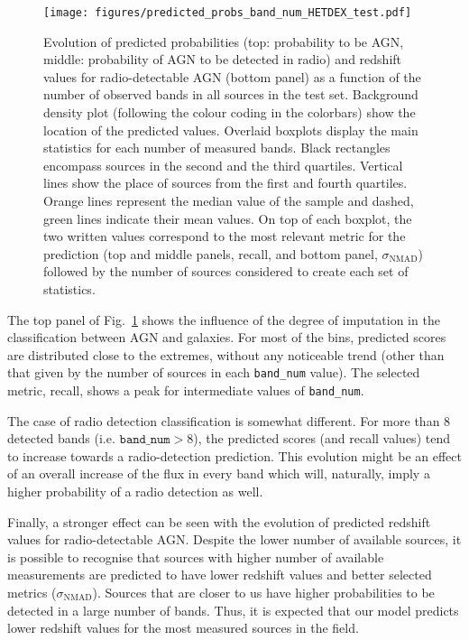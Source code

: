 \documentclass{aa}
\begin{document}
\begin{figure}
  \centering
    \texttt{[image: figures/predicted\_probs\_band\_num\_HETDEX\_test.pdf]}
  \caption{Evolution of predicted probabilities (top: probability to be AGN, middle: probability of AGN to be detected in radio) and redshift values for radio-detectable AGN (bottom panel) as a function of the number of observed bands in all sources in the test set. Background density plot (following the colour coding in the colorbars) show the location of the predicted values. Overlaid boxplots display the main statistics for each number of measured bands. Black rectangles encompass sources in the second and the third quartiles. Vertical lines show the place of sources from the first and fourth quartiles. Orange lines represent the median value of the sample and dashed, green lines indicate their mean values. On top of each boxplot, the two written values correspond to the most relevant metric for the prediction (top and middle panels, recall, and bottom panel, $\sigma_{\mathrm{NMAD}}$) followed by the number of sources considered to create each set of statistics.}
  \label{fig:probs_band_num_test}
\end{figure}

The top panel of Fig.~\ref{fig:probs_band_num_test} shows the influence of the degree of imputation in the classification between AGN and galaxies. For most of the bins, predicted scores are distributed close to the extremes, without any noticeable trend (other than that given by the number of sources in each \texttt{band\_num} value). The selected metric, recall, shows a peak for intermediate values of \texttt{band\_num}.

The case of radio detection classification is somewhat different. For more than $8$ detected bands (i.e. $\mathtt{band\_num} > 8$), the predicted scores (and recall values) tend to increase towards a radio-detection prediction. This evolution might be an effect of an overall increase of the flux in every band which will, naturally, imply a higher probability of a radio detection as well.

Finally, a stronger effect can be seen with the evolution of predicted redshift values for radio-detectable AGN. Despite the lower number of available sources, it is possible to recognise that sources with higher number of available measurements are predicted to have lower redshift values and better selected metrics ($\sigma_{\mathrm{NMAD}}$). Sources that are closer to us have higher probabilities to be detected in a large number of bands. Thus, it is expected that our model predicts lower redshift values for the most measured sources in the field.
\end{document}
